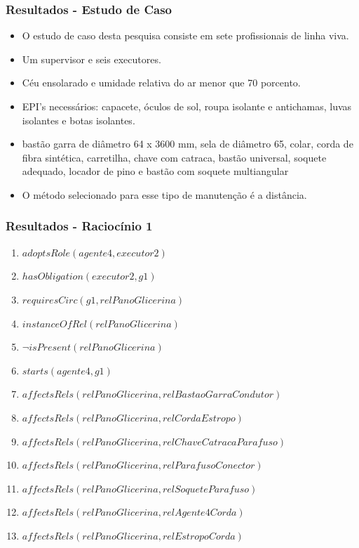 \documentclass{beamer}
\begin{document}
\begin{frame}
	\frametitle{Resultados - Estudo de Caso}
	\begin{itemize}
		\item O estudo de caso desta pesquisa consiste em sete profissionais de linha viva.
		\item Um supervisor e seis executores.
		\item Céu ensolarado e umidade relativa do ar menor que 70 porcento.
		\item EPI's necessários: capacete, óculos de sol, roupa isolante e antichamas, luvas isolantes e botas isolantes.
		\item  bastão garra de diâmetro 64 x 3600 mm, sela de diâmetro 65, colar, corda de fibra sintética, carretilha, chave com catraca, bastão universal, soquete adequado, locador de pino e bastão com soquete multiangular
		\item O método selecionado para esse tipo de manutenção é a distância.
	\end{itemize}
\end{frame}
\begin{frame}
	\frametitle{Resultados - Raciocínio 1}
	\begin{enumerate}
		\item $adoptsRole(agente4,executor2)$ 
		\item $hasObligation(executor2,g1)$
		\item $requiresCirc(g1,relPanoGlicerina)$
		\item $instanceOfRel(relPanoGlicerina)$ 
		\item $\neg isPresent(relPanoGlicerina)$
		\item $starts(agente4,g1)$
		\item $affectsRels(relPanoGlicerina,relBastaoGarraCondutor)$
		\item $affectsRels(relPanoGlicerina,relCordaEstropo)$  
		\item $affectsRels(relPanoGlicerina,relChaveCatracaParafuso)$
		\item $affectsRels(relPanoGlicerina,relParafusoConector)$ 
		\item $affectsRels(relPanoGlicerina,relSoqueteParafuso)$ 
		\item $affectsRels(relPanoGlicerina,relAgente4Corda)$ 
		\item $affectsRels(relPanoGlicerina,relEstropoCorda)$	
	\end{enumerate}
\end{frame}
\end{document}
